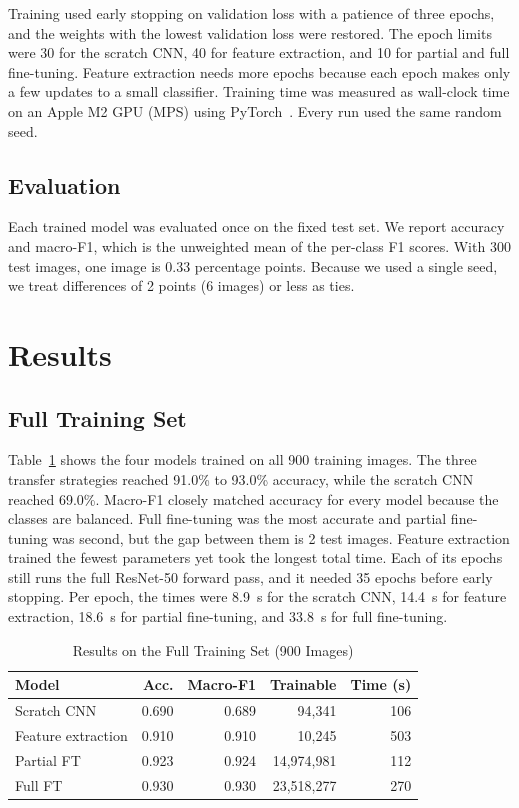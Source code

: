 \documentclass[journal]{IEEEtran}
\begin{document}
Training used early stopping on validation loss with a patience of three epochs, and the weights with the lowest validation loss were restored. The epoch limits were 30 for the scratch CNN, 40 for feature extraction, and 10 for partial and full fine-tuning. Feature extraction needs more epochs because each epoch makes only a few updates to a small classifier. Training time was measured as wall-clock time on an Apple M2 GPU (MPS) using PyTorch~\cite{paszke2019pytorch}. Every run used the same random seed.

\subsection{Evaluation}
Each trained model was evaluated once on the fixed test set. We report accuracy and macro-F1, which is the unweighted mean of the per-class F1 scores. With 300 test images, one image is 0.33 percentage points. Because we used a single seed, we treat differences of 2 points (6 images) or less as ties.

\section{Results}

\subsection{Full Training Set}
Table~\ref{tab:full} shows the four models trained on all 900 training images. The three transfer strategies reached 91.0\% to 93.0\% accuracy, while the scratch CNN reached 69.0\%. Macro-F1 closely matched accuracy for every model because the classes are balanced. Full fine-tuning was the most accurate and partial fine-tuning was second, but the gap between them is 2 test images. Feature extraction trained the fewest parameters yet took the longest total time. Each of its epochs still runs the full ResNet-50 forward pass, and it needed 35 epochs before early stopping. Per epoch, the times were 8.9~s for the scratch CNN, 14.4~s for feature extraction, 18.6~s for partial fine-tuning, and 33.8~s for full fine-tuning.

\begin{table}[!t]
\caption{Results on the Full Training Set (900 Images)}
\label{tab:full}
\centering
\begin{tabular}{@{}lrrrr@{}}
\toprule
Model & Acc. & Macro-F1 & Trainable & Time (s) \\
\midrule
Scratch CNN        & 0.690 & 0.689 & 94,341     & 106 \\
Feature extraction & 0.910 & 0.910 & 10,245     & 503 \\
Partial FT         & 0.923 & 0.924 & 14,974,981 & 112 \\
Full FT            & 0.930 & 0.930 & 23,518,277 & 270 \\
\bottomrule
\end{tabular}
\end{table}
\end{document}
